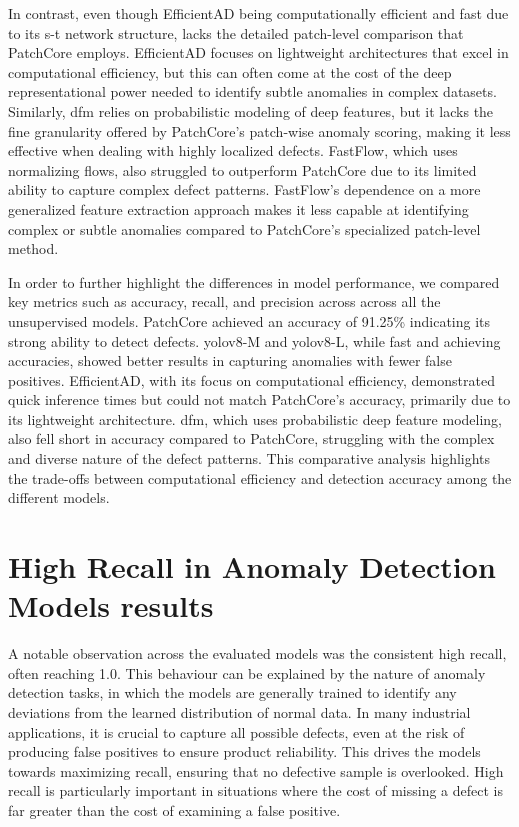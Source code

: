 In contrast, even though EfficientAD being computationally efficient and fast due to its \gls{s-t} network structure, lacks the detailed patch-level comparison that PatchCore employs. EfficientAD focuses on lightweight architectures that excel in computational efficiency, but this can often come at the cost of the deep representational power needed to identify subtle anomalies in complex datasets. Similarly, \gls{dfm} relies on probabilistic modeling of deep features, but it lacks the fine granularity offered by PatchCore's patch-wise anomaly scoring, making it less effective when dealing with highly localized defects. FastFlow, which uses normalizing flows, also struggled to outperform PatchCore due to its limited ability to capture complex defect patterns. FastFlow's dependence on a more generalized feature extraction approach makes it less capable at identifying complex or subtle anomalies compared to PatchCore's specialized patch-level method.

In order to further highlight the differences in model performance, we compared key metrics such as accuracy, recall, and precision across across all the unsupervised models. PatchCore achieved an accuracy of 91.25\% indicating its strong ability to detect defects. \gls{yolo}v8-M and \gls{yolo}v8-L, while fast and achieving accuracies, showed better results in capturing anomalies with fewer false positives. EfficientAD, with its focus on computational efficiency, demonstrated quick inference times but could not match PatchCore's accuracy, primarily due to its lightweight architecture. \gls{dfm}, which uses probabilistic deep feature modeling, also fell short in accuracy compared to PatchCore, struggling with the complex and diverse nature of the defect patterns. This comparative analysis highlights the trade-offs between computational efficiency and detection accuracy among the different models.

\section*{High Recall in Anomaly Detection Models results}

A notable observation across the evaluated models was the consistent high recall, often reaching 1.0. This behaviour can be explained by the nature of anomaly detection tasks, in which the models are generally trained to identify any deviations from the learned distribution of normal data. In many industrial applications, it is crucial to capture all possible defects, even at the risk of producing false positives to ensure product reliability. This drives the models towards maximizing recall, ensuring that no defective sample is overlooked. High recall is particularly important in situations where the cost of missing a defect is far greater than the cost of examining a false positive.

